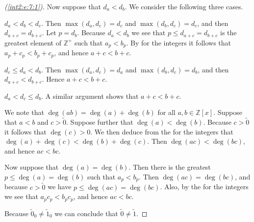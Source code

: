 \begin{proof}[(\ref{int2:e:7:1})]
	Now suppose that $d_a < d_b$. We consider the following three cases.
	\begin{bycases}
		\item $d_a < d_b < d_c$. Then $\max(d_a, d_c) = d_c$ and $\max(d_b, d_c) = d_c$, and then $d_{a+c} = d_{b+c}$. Let $p = d_b$. Because $d_a < d_b$ we see that $p \leq d_{a+c} = d_{b+c}$ is the greatest element of $\mathbb{Z}^{+}$ such that $a_p < b_p$.  By  for the integers it follows that $a_p + c_p < b_p + c_p$, and hence $a + c < b + c$.
		\item $d_c \leq d_a < d_b$. Then $\max(d_a, d_c) = d_a$ and $\max(d_b, d_c) = d_b$, and then $d_{a+c} < d_{b+c}$. Hence $a + c < b + c$.
		\item $d_a < d_c \leq d_b$. A similar argument shows that $a + c < b + c$.
	\end{bycases}

	We note that $\deg(a b) = \deg(a) + \deg(b)$ for all $a, b \in \mathbb{Z}[x]$. Suppose that $a < b$ and $c > \widetilde{0}$. Suppose further that $\deg(a) < \deg(b)$. Because $c > \widetilde{0}$ it follows that $\deg(c) > 0$. We then deduce from the  for the integers that $\deg(a) + \deg(c) < \deg(b) + \deg(c)$. Then $\deg(a c) < \deg(b c)$, and hence $a c < b c$.

	Now suppose that $\deg(a) = \deg(b)$. Then there is the greatest $p \leq \deg(a) = \deg(b)$ such that $a_p < b_p$. Then $\deg(a c) = \deg(b c)$, and because $c > \widetilde{0}$ we have $p \leq \deg(a c) = \deg(b c)$. Also, by the  for the integers we see that $a_p c_p < b_p c_p$, and hence $a c < b c$.

	Because $\widetilde{0}_0 \not= \widetilde{1}_0$ we can conclude that $\widetilde{0} \not= \widetilde{1}$.
\end{proof}

